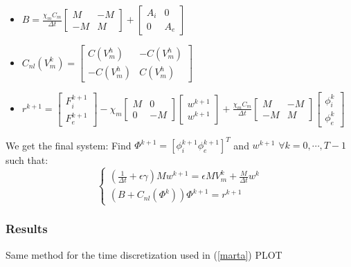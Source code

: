 \documentclass[a4paper,12pt]{article}
\begin{document}
\begin{itemize}
\item $B=\frac{\chi_m C_m}{\Delta t} \begin{bmatrix} M &-M \\-M & M \end{bmatrix}+\begin{bmatrix} A_i & 0 \\ 0 & A_e \end{bmatrix}$
\item $C_{nl}(V_m^k)=\begin{bmatrix}C(V_m^h) & -C(V_m^h) \\ -C(V_m^h) & C(V_m^h) \end{bmatrix}$
\item $r^{k+1}=\begin{bmatrix} F_i^{k+1} \\ F_e^{k+1}\end{bmatrix}-\chi_m \begin{bmatrix}M & 0 \\ 0 & -M \end{bmatrix} \begin{bmatrix}w^{k+1} \\ w^{k+1} \end{bmatrix}+\frac{\chi_m C_m}{\Delta t} \begin{bmatrix} M &-M \\-M & M \end{bmatrix} \begin{bmatrix} \phi_i^k \\ \phi_e^k \end{bmatrix}$
\end{itemize}
We get the final system:\newline
Find $\Phi^{k+1}=[\phi_i^{k+1} \phi_e^{k+1}]^T$ and $w^{k+1}$ $\forall k=0,\cdots,T-1$ such that:
\begin{equation}
\begin{cases}
(\frac{1}{\Delta t}+\epsilon \gamma)M w^{k+1}=\epsilon M V_m^k+\frac{M}{\Delta t} w^k \\
(B+C_{nl}(\Phi^k)) \Phi^{k+1}=r^{k+1}
\end{cases}
\end{equation} 

\subsubsection{Results}
Same method for the time discretization used in (\ref{marta})
PLOT
\end{document}
